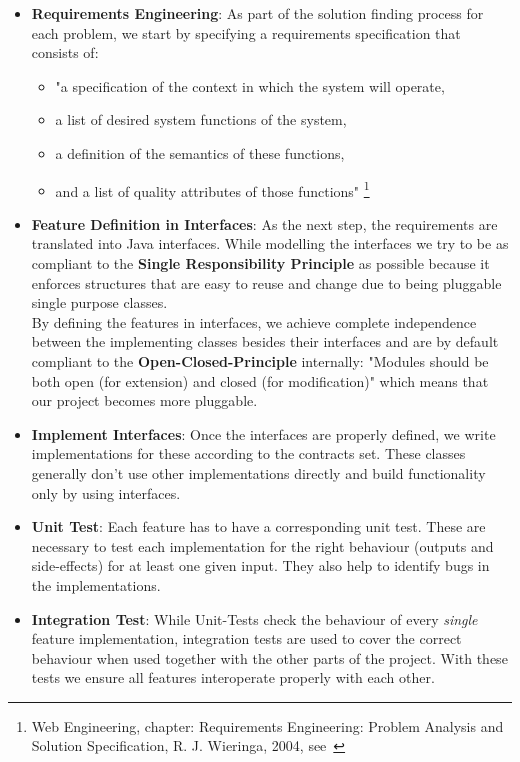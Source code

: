 \begin{itemize}
	\item \textbf{Requirements Engineering}: As part of the solution finding process for each problem, we start by specifying a requirements specification that consists of:
	\begin{itemize}
		\item "a specification of the context in which the system will operate,
		\item a list of desired system functions of the system,
		\item a definition of the semantics of these functions,
		\item and a list of quality attributes of those functions" \footnote{Web Engineering, chapter: Requirements Engineering: Problem Analysis and Solution Specification, R. J. Wieringa, 2004, see~\cite{requirements_engineering}}
	\end{itemize}
	\item \textbf{Feature Definition in Interfaces}: As the next step, the requirements are translated into Java interfaces.	While modelling the interfaces we try to be as compliant to the \textbf{Single Responsibility Principle} as possible because it enforces structures that are easy to reuse and change due to being pluggable single purpose classes.
	\\
	By defining the features in interfaces, we achieve complete independence between the implementing classes besides their interfaces and are by default compliant to the \textbf{Open-Closed-Principle} internally: "Modules should be both open (for extension) and closed (for modification)" which means that our project becomes more pluggable.
	\item \textbf{Implement Interfaces}: Once the interfaces are properly defined, we write implementations for these according to the contracts set. These classes generally don't use other implementations directly and build functionality only by using interfaces.
	\item \textbf{Unit Test}: Each feature has to have a corresponding unit test. These are necessary to test each implementation for the right behaviour (outputs and side-effects) for at least one given input. They also help to identify bugs in the implementations.
	\item \textbf{Integration Test}: While Unit-Tests check the behaviour of every \textit{single} feature implementation, integration tests are used to cover the correct behaviour when used together with the other parts of the project. With these tests we ensure all features interoperate properly with each other.
\end{itemize}
